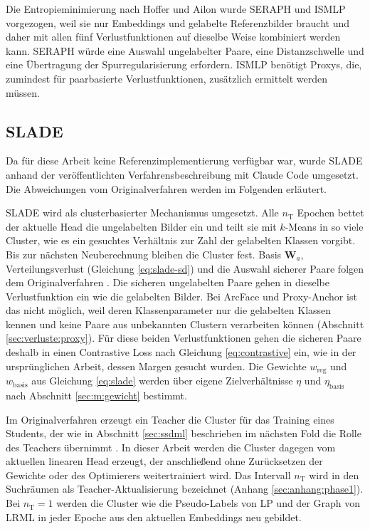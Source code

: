Die Entropieminimierung nach Hoffer und Ailon wurde \ac{SERAPH} und \ac{ISMLP} vorgezogen, weil sie nur Embeddings und gelabelte Referenzbilder braucht und daher mit allen fünf Verlustfunktionen auf dieselbe Weise kombiniert werden kann. \ac{SERAPH} würde eine Auswahl ungelabelter Paare, eine Distanzschwelle und eine Übertragung der Spurregularisierung erfordern. \ac{ISMLP} benötigt Proxys, die, zumindest für paarbasierte Verlustfunktionen, zusätzlich ermittelt werden müssen. 

\subsection{\acs{SLADE}}
\label{sec:m:slade}

Da für diese Arbeit keine Referenzimplementierung verfügbar war, wurde \ac{SLADE} anhand der veröffentlichten Verfahrensbeschreibung mit Claude Code umgesetzt. Die Abweichungen vom Originalverfahren werden im Folgenden erläutert.

\ac{SLADE} wird als clusterbasierter Mechanismus umgesetzt. Alle $n_{\mathrm{T}}$ Epochen bettet der aktuelle Head die ungelabelten Bilder ein und teilt sie mit $k$-Means in so viele Cluster, wie es ein gesuchtes Verhältnis zur Zahl der gelabelten Klassen vorgibt. Bis zur nächsten Neuberechnung bleiben die Cluster fest. Basis $\bm{W}_a$, Verteilungsverlust (Gleichung \eqref{eq:slade-sd}) und die Auswahl sicherer Paare folgen dem Originalverfahren \cite{duan_slade_2021}. Die sicheren ungelabelten Paare gehen in dieselbe Verlustfunktion ein wie die gelabelten Bilder. Bei ArcFace und Proxy-Anchor ist das nicht möglich, weil deren Klassenparameter nur die gelabelten Klassen kennen und keine Paare aus unbekannten Clustern verarbeiten können (Abschnitt \ref{sec:verluste:proxy}). Für diese beiden Verlustfunktionen gehen die sicheren Paare deshalb in einen Contrastive Loss nach Gleichung \eqref{eq:contrastive} ein, wie in der ursprünglichen Arbeit, dessen Margen gesucht wurden. Die Gewichte $w_{\mathrm{reg}}$ und $w_{\mathrm{basis}}$ aus Gleichung \eqref{eq:slade} werden über eigene Zielverhältnisse $\eta$ und $\eta_{\mathrm{basis}}$ nach Abschnitt \ref{sec:m:gewicht} bestimmt.

Im Originalverfahren erzeugt ein Teacher die Cluster für das Training
eines Students, der wie in Abschnitt \ref{sec:ssdml} beschrieben im nächsten Fold die Rolle des Teachers
übernimmt \cite{duan_slade_2021}. In dieser Arbeit werden die
Cluster dagegen vom aktuellen linearen Head erzeugt, der anschließend ohne
Zurücksetzen der Gewichte oder des Optimierers weitertrainiert wird. Das Intervall $n_{\mathrm{T}}$ wird in den
Suchräumen als Teacher-Aktualisierung bezeichnet
(Anhang \ref{sec:anhang:phase1}). Bei $n_{\mathrm{T}}=1$ werden die Cluster wie
die Pseudo-Labels von \ac{LP} und der Graph von \ac{LRML} in jeder Epoche aus
den aktuellen Embeddings neu gebildet.

